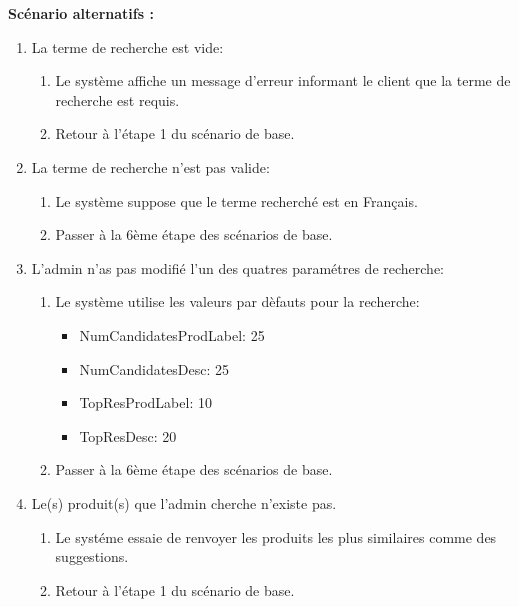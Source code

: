 \newpage
\textbf{Scénario alternatifs : }
\begin{enumerate}
	\item La terme de recherche est vide:
	      \begin{enumerate}
		      \item Le système affiche un message d'erreur informant le client que la terme de recherche est requis.
		      \item Retour à l'étape 1 du scénario de base.
	      \end{enumerate}
	\item La terme de recherche n'est pas valide:
	      \begin{enumerate}
		      \item Le système suppose que le terme recherché est en Français.
		      \item Passer à la 6ème étape des scénarios de base.
	      \end{enumerate}
	\item L'admin n'as pas modifié l'un des quatres paramétres de recherche:
	      \begin{enumerate}
		      \item Le système utilise les valeurs par dèfauts pour la recherche:
		      \begin{itemize}
						\item NumCandidatesProdLabel: 25
						\item NumCandidatesDesc: 25
						\item TopResProdLabel: 10
						\item TopResDesc: 20
					\end{itemize}
		      \item Passer à la 6ème étape des scénarios de base.
	      \end{enumerate}
	\item Le(s) produit(s) que l'admin cherche n'existe pas.
	      \begin{enumerate}
		      \item Le systéme essaie de renvoyer les produits les plus similaires comme des suggestions.
		      \item Retour à l'étape 1 du scénario de base.
	      \end{enumerate}
\end{enumerate}


